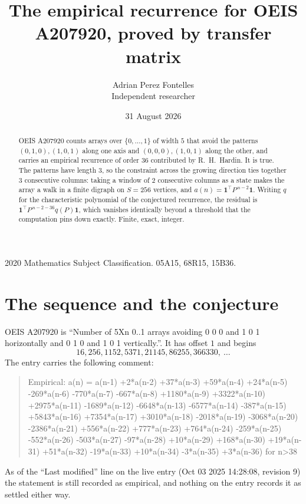 \documentclass[11pt,a4paper]{article}
\title{The empirical recurrence for OEIS A207920, proved by transfer matrix}
\author{Adrian Perez Fontelles\\ \small Independent researcher}
\date{31 August 2026}
\theoremstyle{plain}
\theoremstyle{definition}
\begin{document}
\maketitle

\begin{abstract}
OEIS A207920 counts arrays over $\{0,\dots,1\}$ of width $5$ that avoid the patterns
$(0,1,0), (1,0,1)$ along one axis and $(0,0,0), (1,0,1)$ along the other, and carries an empirical recurrence of
order $36$ contributed by R.~H.~Hardin. It is true. The patterns have length $3$, so
the constraint across the growing direction ties together $3$ consecutive columns: taking a
window of $2$ consecutive columns as a state makes the array a walk in a finite digraph
on $S=256$ vertices, and $a(n)=\mathbf{1}^{\!\top}P^{\,n-2}\mathbf{1}$. Writing $q$
for the characteristic polynomial of the conjectured recurrence, the residual is
$\mathbf{1}^{\!\top}P^{\,n-2-36}q(P)\mathbf{1}$, which vanishes identically
beyond a threshold that the computation pins down exactly. Finite, exact, integer.
\end{abstract}

\noindent\small 2020 Mathematics Subject Classification. 05A15, 68R15, 15B36.\normalsize

\section{The sequence and the conjecture}

OEIS A207920 is ``Number of 5Xn 0..1 arrays avoiding 0 0 0 and 1 0 1 horizontally and 0 1 0 and 1 0 1 vertically.''. It has offset
$1$ and begins
\[
16, 256, 1152, 5371, 21145, 86255, 366330,\ \dots
\]
The entry carries the following comment:
\begin{quote}\small
Empirical: a(n) = a(n-1) +2*a(n-2) +37*a(n-3) +59*a(n-4) +24*a(n-5) -269*a(n-6) -770*a(n-7) -667*a(n-8) +1180*a(n-9) +3322*a(n-10) +2975*a(n-11) -1689*a(n-12) -6648*a(n-13) -6577*a(n-14) -387*a(n-15) +5843*a(n-16) +7354*a(n-17) +3010*a(n-18) -2018*a(n-19) -3068*a(n-20) -2386*a(n-21) +556*a(n-22) +777*a(n-23) +764*a(n-24) -259*a(n-25) -552*a(n-26) -503*a(n-27) -97*a(n-28) +10*a(n-29) +168*a(n-30) +19*a(n-31) +51*a(n-32) -19*a(n-33) +10*a(n-34) -3*a(n-35) +3*a(n-36) for n>38
\end{quote}
As of the ``Last modified'' line on the live entry (Oct 03 2025 14:28:08, revision
9) the statement is still recorded as empirical, and nothing on the entry
records it as settled either way.
\end{document}
